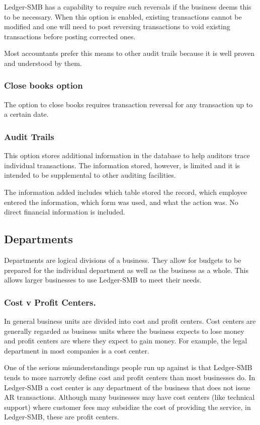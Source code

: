 \documentclass{article}
\begin{document}
Ledger-SMB has a capability to require such reversals if the business deems this
to be necessary.  When this option is enabled, existing transactions cannot be
modified and one will need to post reversing transactions to void existing
transactions before posting corrected ones.

Most accountants prefer this means to other audit trails because it is well
proven and understood by them.

\subsubsection{Close books option}
The option to close books requires transaction reversal for any transaction up
to a certain date.

\subsubsection{Audit Trails}
This option stores additional information in the database to help auditors trace
individual transactions.  The information stored, however, is limited and it is
intended to be supplemental to other auditing facilities.

The information added includes which table stored the record, which employee
entered the information, which form was used, and what the action was.  No
direct financial information is included.

\subsection{Departments}
Departments are logical divisions of a business.  They allow for budgets to be
prepared for the individual department as well as the business as a whole.  This
allows larger businesses to use Ledger-SMB to meet their needs.

\subsubsection{Cost v Profit Centers.}

In general business units are divided into cost and profit centers.  Cost
centers are generally regarded as business units where the business expects to
lose money and profit centers are where they expect to gain money.  For example,
the legal department in most companies is a cost center.

One of the serious misunderstandings people run up against is that Ledger-SMB
tends to more narrowly define cost and profit centers than most businesses do.
In Ledger-SMB a cost center is any department of the business that does not
issue AR transactions.  Although many businesses may have cost centers (like
technical support) where customer fees may subsidize the cost of providing the
service, in Ledger-SMB, these are profit centers.
\end{document}
